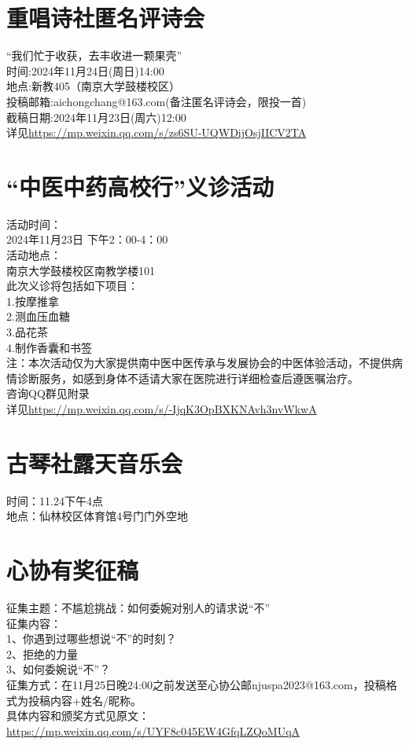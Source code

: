 \documentclass[letterpaper, 12pt]{article}
\begin{document}
\begin{multicols}{2}
\section{重唱诗社匿名评诗会}
“我们忙于收获，去丰收进一颗果壳”\\
时间:2024年11月24日(周日)14:00\\
地点:新教405（南京大学鼓楼校区）\\
投稿邮箱:aichongchang@163.com(备注匿名评诗会，限投一首)\\
截稿日期:2024年11月23日(周六)12:00\\
详见\url{https://mp.weixin.qq.com/s/zs6SU-UQWDijOsjIICV2TA}

\section{“中医中药高校行”义诊活动}
活动时间：\\
2024年11月23日 下午2：00-4：00\\
活动地点：\\
南京大学鼓楼校区南教学楼101\\
此次义诊将包括如下项目：\\
1.按摩推拿\\
2.测血压血糖\\
3.品花茶\\
4.制作香囊和书签\\
注：本次活动仅为大家提供南中医中医传承与发展协会的中医体验活动，不提供病情诊断服务，如感到身体不适请大家在医院进行详细检查后遵医嘱治疗。\\
咨询QQ群见附录\\
详见\url{https://mp.weixin.qq.com/s/-IjqK3OpBXKNAvh3nvWkwA}

\section{古琴社露天音乐会}
时间：11.24下午4点\\
地点：仙林校区体育馆4号门门外空地


\section{心协有奖征稿}
征集主题：不尴尬挑战：如何委婉对别人的请求说“不”\\
征集内容：\\
1、你遇到过哪些想说“不”的时刻？\\
2、拒绝的力量\\
3、如何委婉说“不”？\\
征集方式：在11月25日晚24:00之前发送至心协公邮njuspa2023@163.com，投稿格式为投稿内容+姓名/昵称。\\
具体内容和颁奖方式见原文：\url{https://mp.weixin.qq.com/s/UYF8c045EW4GfqLZQoMUqA}


\end{multicols}
\end{document}
